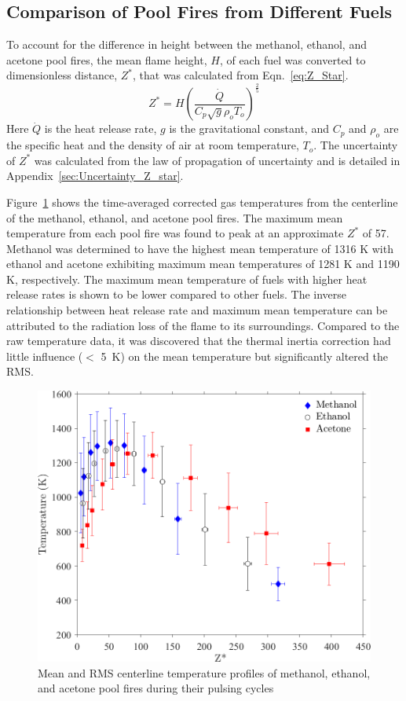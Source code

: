 \documentclass[12pt]{article}
\begin{document}
\subsection{Comparison of Pool Fires from Different Fuels}
\label{ssec:Fuel_comp}
To account for the difference in height between the methanol, ethanol, and acetone pool fires, the mean flame height, $H$, of each fuel was converted to dimensionless distance, $Z^{*}$, that was calculated from Eqn.~\ref{eq:Z_Star}.
\begin{equation}\label{eq:Z_Star}
Z^{*}=H\left(\frac{\dot{Q}}{C_{p}\sqrt{g}\rho_{o}T_{o}}\right)^{\frac{2}{5}}
\end{equation}
Here $\dot{Q}$ is the heat release rate, $g$ is the gravitational constant, and $C_p$ and $\rho_o$ are the specific heat and the density of air at room temperature, $T_o$. The uncertainty of $Z^{*}$ was calculated from the law of propagation of uncertainty and is detailed in Appendix~\ref{sec:Uncertainty_Z_star}.

Figure~\ref{fig:Temp_Comparison} shows the time-averaged corrected gas temperatures from the centerline of the methanol, ethanol, and acetone pool fires. The maximum mean temperature from each pool fire was found to peak at an approximate $Z^{*}$ of 57. Methanol was determined to have the highest mean temperature of 1316 K with ethanol and acetone exhibiting maximum mean temperatures of 1281 K and 1190 K, respectively. The maximum mean temperature of fuels with higher heat release rates is shown to be lower compared to other fuels. The inverse relationship between heat release rate and maximum mean temperature can be attributed to the radiation loss of the flame to its surroundings. Compared to the raw temperature data, it was discovered that the thermal inertia correction had little influence ($<$ \SI{5}{K}) on the mean temperature but significantly altered the RMS.

\begin{figure}[h!]
	\centering
\includegraphics[width=11.0 cm, keepaspectratio]{Temperature_Comparison.png}
	\caption[Major Species Comparison]{Mean and RMS centerline temperature profiles of methanol, ethanol, and acetone pool fires during their pulsing cycles}
	\label{fig:Temp_Comparison}
\end{figure}
\end{document}
